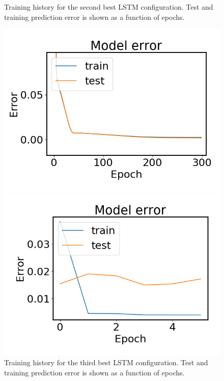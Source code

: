 \begin{figure}
\begin{minipage}[b]{0.49\linewidth}
            \caption{Training history for the second best LSTM configuration. Test and training prediction error is shown as a function of epochs.}
        \end{minipage}
    \end{figure}

    \begin{figure}
        \begin{minipage}[b]{0.49\linewidth}
            \centering
            \includegraphics[width = \textwidth]{report/figures/analysis/lstm_gridsearch/best_lstm_error_3_zoomed.png}
            \caption{Training history for the third best LSTM configuration. Test and training prediction error is shown as a function of epochs.}
        \end{minipage}
        \hfill\vline\hfill
        \begin{minipage}[b]{0.49\linewidth}
            \centering
            \includegraphics[width = \textwidth]{report/figures/analysis/lstm_gridsearch/worst_lstm_error_-3.png}

\end{minipage}
\end{figure}
